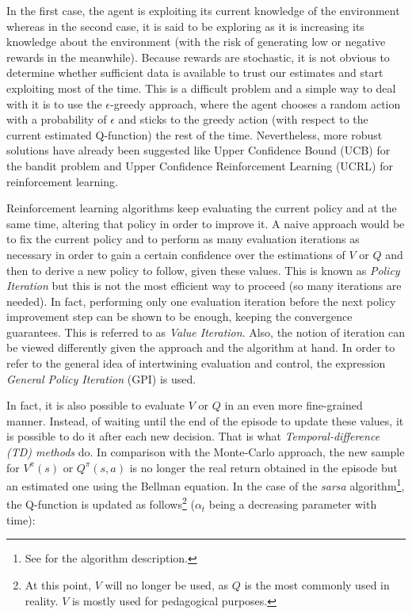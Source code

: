 			In the first case, the agent is exploiting its current knowledge of the environment whereas in the second case, it is said to be exploring as it is increasing its knowledge about the environment (with the risk of generating low or negative rewards in the meanwhile). Because rewards are stochastic, it is not obvious to determine whether sufficient data is available to trust our estimates and start exploiting most of the time. This is a difficult problem and a simple way to deal with it is to use the $\epsilon$-greedy approach, where the agent chooses a random action with a probability of $\epsilon$ and sticks to the greedy action (with respect to the current estimated Q-function) the rest of the time. Nevertheless, more robust solutions have already been suggested like Upper Confidence Bound (UCB) \cite{Auer2002} for the bandit problem and Upper Confidence Reinforcement Learning (UCRL) \cite{Auer2005} for reinforcement learning.
			
			Reinforcement learning algorithms keep evaluating the current policy and at the same time, altering that policy in order to improve it. A naive approach would be to fix the current policy and to perform as many evaluation iterations as necessary in order to gain a certain confidence over the estimations of $V$ or $Q$ and then to derive a new policy to follow, given these values. This is known as \textit{Policy Iteration} but this is not the most efficient way to proceed (so many iterations are needed). In fact, performing only one evaluation iteration before the next policy improvement step can be shown to be enough, keeping the convergence guarantees. This is referred to as \textit{Value Iteration}. Also, the notion of iteration can be viewed differently given the approach and the algorithm at hand. In order to refer to the general idea of intertwining evaluation and control, the expression \textit{General Policy Iteration} (GPI) is used.
			
			In fact, it is also possible to evaluate $V$ or $Q$ in an even more fine-grained manner. Instead, of waiting until the end of the episode to update these values, it is possible to do it after each new decision. That is what \textit{Temporal-difference (TD) methods} do. In comparison with the Monte-Carlo approach, the new sample for $V^\pi(s)$ or $Q^\pi(s,a)$ is no longer the real return obtained in the episode but an estimated one using the Bellman equation. In the case of the \textit{sarsa} algorithm\footnote{See \cite{Sutton1998} for the algorithm description.}, the Q-function is updated as follows\footnote{At this point, $V$ will no longer be used, as $Q$ is the most commonly used in reality. $V$ is mostly used for pedagogical purposes.} ($\alpha_t$ being a decreasing parameter with time):
			
